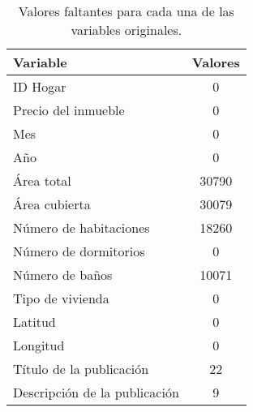 \begin{table}[H!]
\centering
\caption{Valores faltantes para cada una de las variables originales.} 
\label{Tab:valoresFaltantes}
\begin{tabular}{lc}
  \hline
Variable & Valores \\ 
  \hline
ID Hogar & 0 \\ 
  Precio del inmueble & 0 \\ 
  Mes & 0 \\ 
  Año & 0 \\ 
  Área total & 30790 \\ 
  Área cubierta & 30079 \\ 
  Número de habitaciones & 18260 \\ 
  Número de dormitorios & 0 \\ 
  Número de baños & 10071 \\ 
  Tipo de vivienda & 0 \\ 
  Latitud & 0 \\ 
  Longitud & 0 \\ 
  Título de la publicación & 22 \\ 
  Descripción de la publicación & 9 \\ 
   \hline
\end{tabular}
\end{table}
